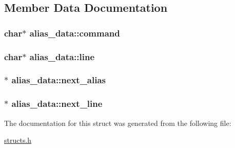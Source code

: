\subsection{Member Data Documentation}
\hypertarget{structalias__data_aacc66e9add04da6d9cf229bc4096f8b2}{
\subsubsection[{command}]{\setlength{\rightskip}{0pt plus 5cm}char$\ast$ alias\-\_\-data\-::command}}\label{structalias__data_aacc66e9add04da6d9cf229bc4096f8b2}
\hypertarget{structalias__data_a2f7beff3bfaffb4d5db211fe31046ab3}{
\subsubsection[{line}]{\setlength{\rightskip}{0pt plus 5cm}char$\ast$ alias\-\_\-data\-::line}}\label{structalias__data_a2f7beff3bfaffb4d5db211fe31046ab3}
\hypertarget{structalias__data_a24281405b5307efa5c6eb370159bcfbc}{
\subsubsection[{next\-\_\-alias}]{$\ast$ alias\-\_\-data\-::next\-\_\-alias}}\label{structalias__data_a24281405b5307efa5c6eb370159bcfbc}
\hypertarget{structalias__data_a896cbb452e23a405fa4314864f29bfcb}{
\subsubsection[{next\-\_\-line}]{$\ast$ alias\-\_\-data\-::next\-\_\-line}}\label{structalias__data_a896cbb452e23a405fa4314864f29bfcb}


The documentation for this struct was generated from the following file\-:\begin{DoxyCompactItemize}
\item 
\hyperlink{structs_8h}{structs.\-h}\end{DoxyCompactItemize}

